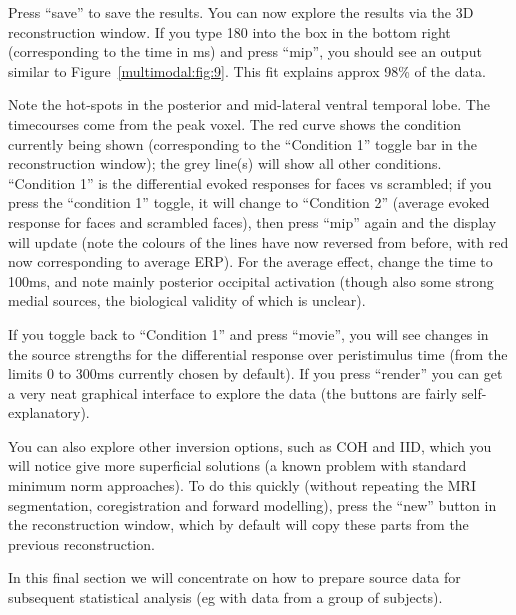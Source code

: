 Press ``save'' to save the results. You can now explore the results via the 3D reconstruction window. If you type 180 into the box in the bottom right (corresponding to the time in ms) and press ``mip'', you should see an output similar to Figure~\ref{multimodal:fig:9}. This fit explains approx 98\% of the data.

Note the hot-spots in the posterior and mid-lateral ventral temporal lobe. The timecourses come from the peak voxel. The red curve shows the condition currently being shown (corresponding to the ``Condition 1'' toggle bar in the reconstruction window); the grey line(s) will show all other conditions. ``Condition 1'' is the differential evoked responses for faces vs scrambled; if you press the ``condition 1'' toggle, it will change to ``Condition 2'' (average evoked response for faces and scrambled faces), then press ``mip'' again and the display will update (note the colours of the lines have now reversed from before, with red now corresponding to average ERP). For the average effect, change the time to 100ms, and note mainly posterior occipital activation (though also some strong medial sources, the biological validity of which is unclear).

If you toggle back to ``Condition 1'' and press ``movie'', you will see changes in the source strengths for the differential response over peristimulus time (from the limits 0 to 300ms currently chosen by default).
If you press ``render'' you can get a very neat graphical interface to explore the data (the buttons are fairly self-explanatory). 

You can also explore other inversion options, such as COH and IID, which you will notice give more superficial solutions (a known problem with standard minimum norm approaches). To do this quickly (without repeating the MRI segmentation, coregistration and forward modelling), press the ``new'' button in the reconstruction window, which by default will copy these parts from the previous reconstruction.

In this final section we will concentrate on how to prepare source data for subsequent statistical analysis (eg with data from a group of subjects).

